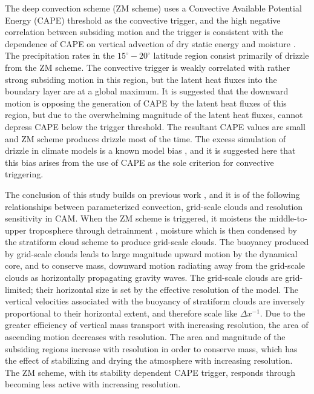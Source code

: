 The \cite{ZM1995AO} deep convection scheme (ZM scheme) uses a Convective Available Potential Energy (CAPE) threshold as the convective trigger, and the high negative correlation between subsiding motion and the trigger is consistent with the dependence of CAPE on vertical advection of dry static energy and moisture \citep{Z2002JGR}. The precipitation rates in the $15^{\circ} - 20^{\circ}$ latitude region consist primarily of drizzle from the ZM scheme. The convective trigger is weakly correlated with rather strong subsiding motion in this region, but the latent heat fluxes into the boundary layer are at a global maximum. It is suggested that the downward motion is opposing the generation of CAPE by the latent heat fluxes of this region, but due to the overwhelming magnitude of the latent heat fluxes, cannot depress CAPE below the trigger threshold. The resultant CAPE values are small and ZM scheme produces drizzle most of the time. The excess simulation of drizzle in climate models is a known model bias \citep{D2006JCLIM}, and it is suggested here that this bias arises from the use of CAPE as the sole criterion for convective triggering.

The conclusion of this study builds on previous work \citep[][Chapter~\ref{sec:chapter5}]{HR2017JCLIM,HR2018JAMES}, and it is of the following relationships between parameterized convection, grid-scale clouds and resolution sensitivity in CAM. When the ZM scheme is triggered, it moistens the middle-to-upper troposphere through detrainment \citep{ZM1995AO}, moisture which is then condensed by the stratiform cloud scheme to produce grid-scale clouds. The buoyancy produced by grid-scale clouds leads to large magnitude upward motion by the dynamical core, and to conserve mass, downward motion radiating away from the grid-scale clouds as horizontally propagating gravity waves. The grid-scale clouds are grid-limited; their horizontal size is set by the effective resolution of the model. The vertical velocities associated with the buoyancy of stratiform clouds are inversely proportional to their horizontal extent, and therefore scale like $\Delta x^{-1}$. Due to the greater efficiency of vertical mass transport with increasing resolution, the area of ascending motion decreases with resolution. The area and magnitude of the subsiding regions increase with resolution in order to conserve mass, which has the effect of stabilizing and drying the atmosphere with increasing resolution. The ZM scheme, with its stability dependent CAPE trigger, responds through becoming less active with increasing resolution.
